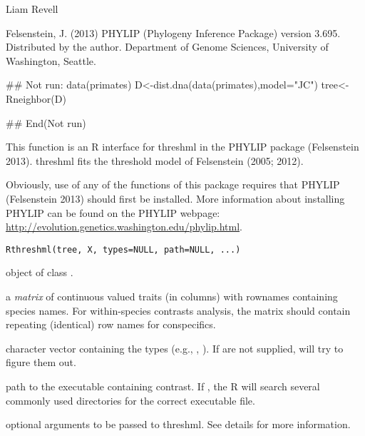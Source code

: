 \documentclass[a4paper]{book}
\begin{document}
%
\begin{Author}\relax
Liam Revell 
\end{Author}
%
\begin{References}\relax
Felsenstein, J. (2013) PHYLIP (Phylogeny Inference Package) version 3.695. Distributed by the author. Department of Genome Sciences, University of Washington, Seattle.
\end{References}
%
\begin{SeeAlso}\relax
{}
\end{SeeAlso}
%
\begin{Examples}
\begin{ExampleCode}
## Not run: 
data(primates)
D<-dist.dna(data(primates),model="JC")
tree<-Rneighbor(D)

## End(Not run)
\end{ExampleCode}
\end{Examples}
%
\begin{Description}\relax
This function is an R interface for threshml in the PHYLIP package (Felsenstein 2013). threshml fits the threshold model of Felsenstein (2005; 2012).

Obviously, use of any of the functions of this package requires that PHYLIP (Felsenstein 2013) should first be installed. More information about installing PHYLIP can be found on the PHYLIP webpage: \url{http://evolution.genetics.washington.edu/phylip.html}.
\end{Description}
%
\begin{Usage}
\begin{verbatim}
Rthreshml(tree, X, types=NULL, path=NULL, ...)
\end{verbatim}
\end{Usage}
%
\begin{Arguments}
\begin{ldescription}
\item[\code{tree}] object of class .
\item[\code{X}] a \emph{matrix} of continuous valued traits (in columns) with rownames containing species names. For within-species contrasts analysis, the matrix should contain repeating (identical) row names for conspecifics.
\item[\code{types}] character vector containing the types (e.g., , ). If  are not supplied,  will try to figure them out.
\item[\code{path}] path to the executable containing contrast. If , the R will search several commonly used directories for the correct executable file.
\item[\code{...}] optional arguments to be passed to threshml. See details for more information.
\end{ldescription}
\end{Arguments}
\end{document}
